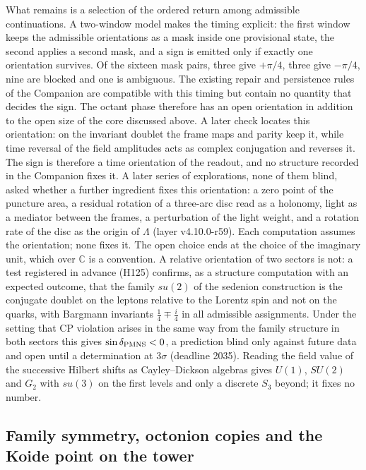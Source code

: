 What remains is a selection of the ordered return among admissible
continuations. A two-window model makes the timing explicit: the first
window keeps the admissible orientations as a mask inside one
provisional state, the second applies a second mask, and a sign is
emitted only if exactly one orientation survives. Of the sixteen mask
pairs, three give $+\pi/4$, three give $-\pi/4$, nine are blocked and
one is ambiguous. The existing repair and persistence rules of the
Companion are compatible with this timing but contain no quantity that
decides the sign. The octant phase therefore has an open orientation
in addition to the open size of the core discussed above. A later
check locates this orientation: on the invariant doublet the frame maps
and parity keep it, while time reversal of the field amplitudes acts as
complex conjugation and reverses it. The sign is therefore a time
orientation of the readout, and no structure recorded in the Companion
fixes it.
A later series of explorations, none of them blind, asked whether a further
ingredient fixes this orientation: a zero point of the puncture area, a
residual rotation of a three-arc disc read as a holonomy, light as a
mediator between the frames, a perturbation of the light weight, and a
rotation rate of the disc as the origin of $\Lambda$ (layer v4.10.0-r59).
Each computation assumes the orientation; none fixes it. The open choice
ends at the choice of the imaginary unit, which over $\mathbb C$ is a
convention. A relative orientation of two sectors is not: a test
registered in advance (H125) confirms, as a structure computation with an
expected outcome, that the family $su(2)$ of the sedenion construction is
the conjugate doublet on the leptons relative to the Lorentz spin and not
on the quarks, with Bargmann invariants $\tfrac14\mp\tfrac i4$ in all
admissible assignments. Under the setting that CP violation arises in the
same way from the family structure in both sectors this gives
$\sin\delta_{\rm PMNS}<0$, a prediction blind only against future data
and open until a determination at $3\sigma$ (deadline 2035). Reading the
field value of the successive Hilbert shifts as Cayley--Dickson algebras
gives $U(1)$, $SU(2)$ and $G_2$ with $su(3)$ on the first levels and only
a discrete $S_3$ beyond; it fixes no number.

\subsection{Family symmetry, octonion copies and the Koide point on the tower}

